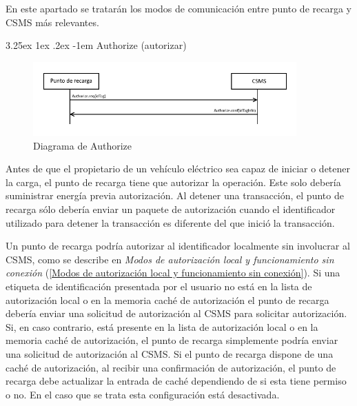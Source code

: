 \documentclass[12pt,a4paper,onecolumn,oneside]{report}
\makeatletter
\newcounter{subsubsubsection}[subsubsection]
\renewcommand\paragraph{\@startsection{paragraph}{5}{\z@}%
  {3.25ex \@plus1ex \@minus.2ex}%
  {-1em}%
  {\normalfont\normalsize\bfseries}}
\makeatother
\begin{document}
\label{Operaciones iniciadas por el punto de recarga}

En este apartado se tratarán los modos de comunicación entre punto de recarga y CSMS más relevantes.

\paragraph{Authorize (autorizar)}
\label{Authorize (Autorizar)}


\begin{figure}[H] 
\centering
  \includegraphics[width=0.9\textwidth]{figuras/diagramaauthorize.png}
  \caption[Diagrama de \textit{Authorize}]{Diagrama de Authorize\\
  }
  \label{fig:diagramaauthorize}
\end{figure}


Antes de que el propietario de un vehículo eléctrico sea capaz de iniciar o detener la carga, el punto de recarga tiene que autorizar la operación. Este solo debería suministrar energía previa autorización. Al detener una transacción, el punto de recarga sólo debería enviar un paquete de autorización cuando el identificador utilizado para detener la transacción es diferente del que inició la transacción.

Un punto de recarga podría autorizar al identificador localmente sin involucrar al CSMS, como se describe en \textit{Modos de autorización local y funcionamiento sin conexión} (\ref{Modos de autorización local y funcionamiento sin conexión}). Si una etiqueta de identificación presentada por el usuario no está en la lista de autorización local o en la memoria caché de autorización el punto de recarga debería enviar una solicitud de autorización al CSMS para solicitar autorización. Si, en caso contrario, está presente en la lista de autorización local o en la memoria caché de autorización, el punto de recarga simplemente podría enviar una solicitud de autorización al CSMS. Si el punto de recarga dispone de una caché de autorización, al recibir una confirmación de autorización, el punto de recarga debe actualizar la entrada de caché dependiendo de si esta tiene permiso o no. En el caso que se trata esta configuración está desactivada.
\end{document}
